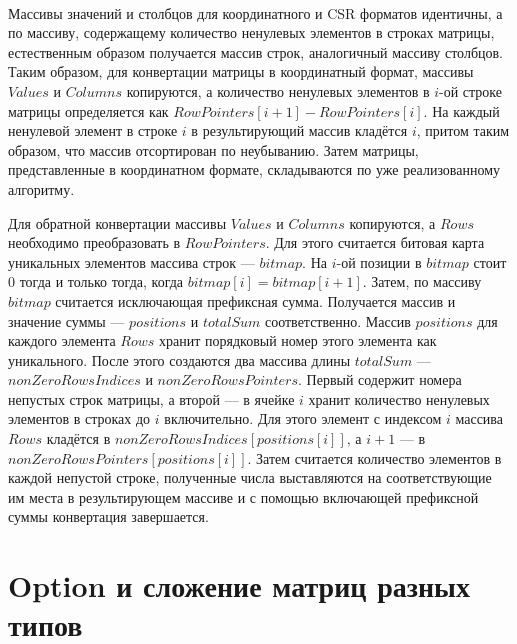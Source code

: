 \documentclass[14pt]{matmex-diploma-custom}
\begin{document}
\paragraph{} Массивы значений и столбцов для координатного и CSR форматов идентичны, а по массиву, содержащему количество ненулевых элементов в строках матрицы, естественным образом получается массив строк, аналогичный массиву столбцов. Таким образом, для конвертации матрицы в координатный формат, массивы $Values$ и $Columns$ копируются, а количество ненулевых элементов в $i$-ой строке матрицы определяется как $RowPointers[i + 1] - RowPointers[i]$. На каждый ненулевой элемент в строке $i$ в результирующий массив кладётся $i$, притом таким образом, что массив отсортирован по неубыванию. Затем матрицы, представленные в координатном формате, складываются по уже реализованному алгоритму.

Для обратной конвертации массивы $Values$ и $Columns$ копируются, а $Rows$ необходимо преобразовать в $RowPointers$. Для этого считается битовая карта уникальных элементов массива строк --- $bitmap$. На $i$-ой позиции в $bitmap$ стоит $0$ тогда и только тогда, когда $bitmap[i] = bitmap[i + 1]$. Затем, по массиву $bitmap$ считается исключающая префиксная сумма. Получается массив и значение суммы --- $positions$ и $totalSum$ соответственно. Массив $positions$ для каждого элемента $Rows$ хранит порядковый номер этого элемента как уникального. После этого создаются два массива длины $totalSum$ --- $nonZeroRowsIndices$ и $nonZeroRowsPointers$. Первый содержит номера непустых строк матрицы, а второй --- в ячейке $i$ хранит количество ненулевых элементов в строках до $i$ включительно. Для этого элемент с индексом $i$ массива $Rows$ кладётся в $nonZeroRowsIndices[positions[i]]$, а $i + 1$ --- в $nonZeroRowsPointers[positions[i]]$. Затем считается количество элементов в каждой непустой строке, полученные числа выставляются на соответствующие им места в результирующем массиве и с помощью включающей префиксной суммы конвертация завершается. 

\section{Option и сложение матриц разных типов}
\end{document}
